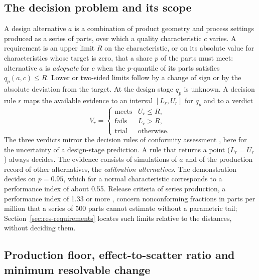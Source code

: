\documentclass[pdflatex,sn-basic,lineno]{sn-jnl}
\begin{document}
\subsection{The decision problem and its scope}\label{sec:problem}

A design alternative $a$ is a combination of product geometry and process settings produced as a series of parts, over which a quality characteristic $c$ varies. A requirement is an upper limit $R$ on the characteristic, or on its absolute value for characteristics whose target is zero, that a share $p$ of the parts must meet: alternative $a$ is \emph{adequate} for $c$ when the $p$-quantile of its parts satisfies $q_p(a,c)\le R$. Lower or two-sided limits follow by a change of sign or by the absolute deviation from the target. At the design stage $q_p$ is unknown. A decision rule $r$ maps the available evidence to an interval $[L_r, U_r]$ for $q_p$ and to a verdict
\begin{equation}
V_r = \begin{cases} \text{meets} & U_r \le R,\\ \text{fails} & L_r > R,\\ \text{trial} & \text{otherwise.} \end{cases}
\label{eq:verdict}
\end{equation}
The three verdicts mirror the decision rules of conformity assessment \citep{iso2017decision}, here for the uncertainty of a design-stage prediction. A rule that returns a point ($L_r=U_r$) always decides. The evidence consists of simulations of $a$ and of the production record of other alternatives, the \emph{calibration alternatives}. The demonstration decides on $p=0.95$, which for a normal characteristic corresponds to a performance index of about 0.55. Release criteria of series production, a performance index of 1.33 or more \citep{aiag2006production}, concern nonconforming fractions in parts per million that a series of 500 parts cannot estimate without a parametric tail; Section~\ref{sec:res-requirements} locates such limits relative to the distances, without deciding them.

\subsection{Production floor, effect-to-scatter ratio and minimum resolvable change}\label{sec:floor}
\end{document}
